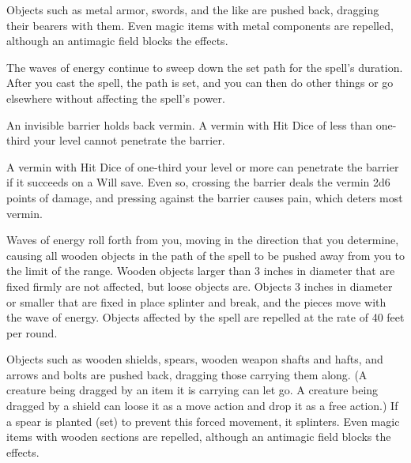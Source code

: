 \begin{multicols}{2}
\begin{small}
\smallskip\noindent Objects such as metal armor, swords, and the like are pushed back, dragging their bearers with them. Even magic items with metal components are repelled, although an antimagic field blocks the effects.

\smallskip\noindent The waves of energy continue to sweep down the set path for the spell's duration. After you cast the spell, the path is set, and you can then do other things or go elsewhere without affecting the spell's power.

\noindent An invisible barrier holds back vermin. A vermin with Hit Dice of less than one-third your level cannot penetrate the barrier.

\smallskip\noindent A vermin with Hit Dice of one-third your level or more can penetrate the barrier if it succeeds on a Will save. Even so, crossing the barrier deals the vermin 2d6 points of damage, and pressing against the barrier causes pain, which deters most vermin.

\noindent Waves of energy roll forth from you, moving in the direction that you determine, causing all wooden objects in the path of the spell to be pushed away from you to the limit of the range. Wooden objects larger than 3 inches in diameter that are fixed firmly are not affected, but loose objects are. Objects 3 inches in diameter or smaller that are fixed in place splinter and break, and the pieces move with the wave of energy. Objects affected by the spell are repelled at the rate of 40 feet per round.

\smallskip\noindent Objects such as wooden shields, spears, wooden weapon shafts and hafts, and arrows and bolts are pushed back, dragging those carrying them along. (A creature being dragged by an item it is carrying can let go. A creature being dragged by a shield can loose it as a move action and drop it as a free action.) If a spear is planted (set) to prevent this forced movement, it splinters. Even magic items with wooden sections are repelled, although an antimagic field blocks the effects.


\end{small}
\end{multicols}
